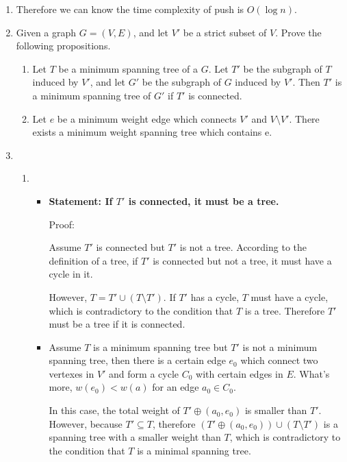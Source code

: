 \documentclass[12pt,a4paper]{article}
\makeatletter
\newtheorem*{solution}{Solution}
\theoremstyle{definition}
\renewenvironment{solution}[1][Solution] {\par\pushQED{\qed}\normalfont\topsep6\p@\@plus6\p@\relax\trivlist\item[\hskip\labelsep\bfseries#1\@addpunct{.}]\ignorespaces}{\popQED\endtrivlist\@endpefalse} \makeatother
\makeatother
\begin{document}
\begin{enumerate}
\begin{solution}
\begin{enumerate}
    		    Therefore we can know the time complexity of push is $O(\log n)$.
    	\end{enumerate}
    \end{solution}
	
	\item Given a graph $G = (V, E)$, and let $V'$ be a strict subset of $V$. Prove the following propositions.
	
	\begin{enumerate}
		\item Let $T$ be a minimum spanning tree of a $G$. Let $T'$ be the subgraph of $T$ induced by $V'$, and let $G'$ be the subgraph of $G$ induced by $V'$. Then $T'$ is a minimum spanning tree of $G'$ if $T'$ is connected.
		\item Let $e$ be a minimum weight edge which connects $V'$ and $V \setminus V'$. There exists a minimum weight spanning tree which contains e.
	\end{enumerate}
    \begin{solution}
    	\begin{enumerate}
    		\item 
    		\ \\
    		\begin{itemize}
    			\item 
    			    \textbf{Statement: If $T'$ is connected, it must be a tree.}  
    			    
    			    Proof:
    			    
    			    Assume $T'$ is connected but $T'$ is not a tree. According to the definition of a tree, if $T'$ is connected but not a tree, it must have a cycle in it.
    			    
    			    However, $T=T'\cup (T\setminus T')$. If $T'$ has a cycle, $T$ must have a cycle, which is contradictory to the condition that $T$ is a tree. Therefore $T'$ must be a tree if it is connected.
    			\item
    			    Assume $T$ is a minimum spanning tree but $T'$ is not a minimum spanning tree, then there is a certain edge $e_0$ which connect two vertexes in $V'$ and form a cycle $C_0$ with certain edges in $E$. What's more, $w(e_0)<w(a)$ for an edge $a_0\in C_0$.
    			    
    			    In this case, the total weight of $T'\oplus(a_0,e_0)$ is smaller than $T'$. However, because $T'\subseteq T$, therefore $(T'\oplus(a_0,e_0))\cup (T \setminus T') $ is a spanning tree with a smaller weight than $T$, which is contradictory to the condition that $T$ is a minimal spanning tree.
    			    

\end{itemize}
\end{enumerate}
\end{solution}
\end{enumerate}
\end{document}
